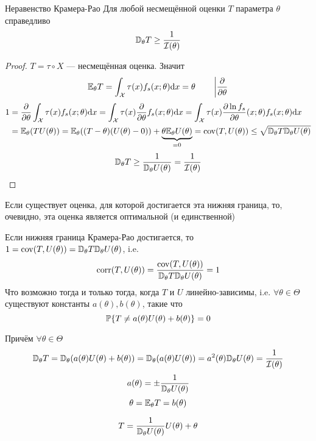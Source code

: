 \begin{thm}{Неравенство Крамера-Рао}
Для любой несмещённой оценки $T$ параметра $\theta$ справедливо
$$\mathbb D_\theta T \geq \frac{1}{\mathcal I(\theta)}$$
\end{thm}
\begin{proof}
$T=\tau\circ X$ --- несмещённая оценка. Значит
$$\mathbb E_\theta T = \int_\mathcal X \tau(x)f_s(x;\theta) \mathrm d x = \theta
\qquad \left|\frac\partial{\partial\theta}\right.$$
$$\begin{aligned}
1
&=\frac\partial{\partial\theta}\int_\mathcal X \tau(x)f_s(x;\theta)\mathrm d x
 = \int_\mathcal X \tau(x) \frac\partial{\partial\theta} f_s(x;\theta)\mathrm d x
 = \int_\mathcal X \tau(x) \frac{\partial\ln f_s}{\partial\theta}(x;\theta)f_s(x;\theta)\mathrm d x \\
&= \mathbb E_\theta(T U(\theta)) = \mathbb E_\theta((T - \theta)(U(\theta)-0)) + \underbrace{\theta\mathbb E_\theta U(\theta)}_{=0}
 = \mathrm{cov}(T,U(\theta))
 \leq \sqrt{\mathbb D_\theta T \mathbb D_\theta U(\theta)}
\end{aligned}$$
$$\mathbb D_\theta T \geq \frac{1}{\mathbb D_\theta U(\theta)} = \frac{1}{\mathcal I(\theta)}$$
\end{proof}

Если существует оценка, для которой достигается эта нижняя граница,
то, очевидно, эта оценка является оптимальной (и единственной)

\begin{thm}
Если нижняя граница Крамера-Рао достигается,
то ${1 = \mathrm{cov}(T,U(\theta)) = \mathbb D_\theta T \mathbb D_\theta U(\theta)}$,
i.e. $$\mathrm{corr}(T,U(\theta)) = \frac{\mathrm{cov}(T,U(\theta))}{\mathbb D_\theta T \mathbb D_\theta U(\theta)} = 1$$
Что возможно тогда и только тогда, когда $T$ и $U$ линейно-зависимы,
i.e. $\forall\theta\in\Theta$ существуют константы $a(\theta), b(\theta)$, такие что
$$\mathbb P\{T \neq a(\theta) U(\theta) + b(\theta)\} = 0$$

Причём $\forall\theta\in\Theta$
$$\mathbb D_\theta T = \mathbb D_\theta(a(\theta)U(\theta) + b(\theta))
= \mathbb D_\theta(a(\theta) U(\theta)) = a^2(\theta) \mathbb D_\theta U(\theta) 
= \frac{1}{\mathcal I(\theta)}$$
$$a(\theta) = \pm\frac{1}{\mathbb D_\theta U(\theta)}$$
$$\theta=\mathbb E_\theta T = b(\theta)$$

$$T = \frac{1}{\mathbb D_\theta U(\theta)}U(\theta) + \theta$$
\end{thm}
